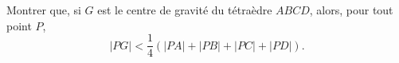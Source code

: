 Montrer que, si $G$ est le centre de gravité du tétraèdre $ABCD$, alors, pour tout point $P$,
\[ |PG| < \frac{1}{4}\left(|PA| + |PB| + |PC| + |PD|\right). \]
